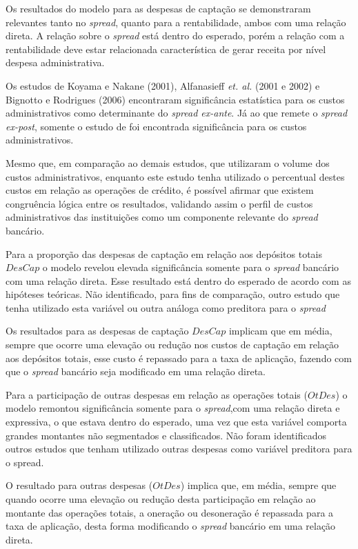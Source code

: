 \documentclass[
  12pt,
  12pt,
  openright,
  oneside,
  a4paper,
  chapter=TITLE,
  section=TITLE,
  subsection=TITLE,
  subsubsection=TITLE,
  english,
  portugues,
  sumario=tradicional]{abntex2}
\begin{document}
Os resultados do modelo para as despesas de captação se demonstraram relevantes tanto no \emph{spread}, quanto para a rentabilidade, ambos com uma relação direta. A relação sobre o \emph{spread} está dentro do esperado, porém a relação com a rentabilidade deve estar relacionada característica de gerar receita por nível despesa administrativa.

Os estudos de Koyama e Nakane (2001), Alfanasieff \emph{et. al.} (2001 e 2002) e Bignotto e Rodrigues (2006) encontraram significância estatística para os custos administrativos como determinante do \emph{spread ex-ante}. Já ao que remete o \emph{spread ex-post}, somente o estudo de \textcite{almeida:2013} foi encontrada significância para os custos administrativos.

Mesmo que, em comparação ao demais estudos, que utilizaram o volume dos custos administrativos, enquanto este estudo tenha utilizado o percentual destes custos em relação as operações de crédito, é possível afirmar que existem congruência lógica entre os resultados, validando assim o perfil de custos administrativos das instituições como um componente relevante do \emph{spread} bancário.

Para a proporção das despesas de captação em relação aos depósitos totais \(DesCap\) o modelo revelou elevada significância somente para o \emph{spread} bancário com uma relação direta. Esse resultado está dentro do esperado de acordo com as hipóteses teóricas. Não identificado, para fins de comparação, outro estudo que tenha utilizado esta variável ou outra análoga como preditora para o \emph{spread}

Os resultados para as despesas de captação \(DesCap\) implicam que em média, sempre que ocorre uma elevação ou redução nos custos de captação em relação aos depósitos totais, esse custo é repassado para a taxa de aplicação, fazendo com que o \emph{spread} bancário seja modificado em uma relação direta.

Para a participação de outras despesas em relação as operações totais (\(OtDes\)) o modelo remontou significância somente para o \emph{spread},com uma relação direta e expressiva, o que estava dentro do esperado, uma vez que esta variável comporta grandes montantes não segmentados e classificados. Não foram identificados outros estudos que tenham utilizado outras despesas como variável preditora para o spread.

O resultado para outras despesas (\(OtDes\)) implica que, em média, sempre que quando ocorre uma elevação ou redução desta participação em relação ao montante das operações totais, a oneração ou desoneração é repassada para a taxa de aplicação, desta forma modificando o \emph{spread} bancário em uma relação direta.
\end{document}
